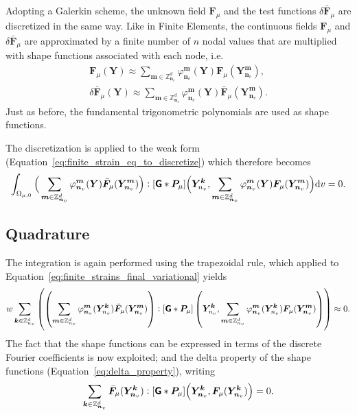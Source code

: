 Adopting a Galerkin scheme, the unknown field \(\bm{F}_\mu\) and the test functions \(\delta \bar{\bm{F}}_\mu\) are discretized in the same way.
Like in Finite Elements, the continuous fields \(\bm{F}_\mu\) and \(\delta \bar{\bm{F}}_\mu\) are approximated by a finite number of \(n\) nodal values that are multiplied with shape functions associated with each node, i.e.
\begin{gather}
\bm{F}_\mu(\bm Y)  \approx \sum_{\bm m\in\mathbb{Z}^d_{\bm n_v} } \varphi_{\bm n_v}^{\bm m}(\bm Y) \bm{F}_\mu (\bm Y^{\bm m}_{\bm n_v}), \\
\delta \bar{\bm{F}}_\mu(\bm Y) \approx \sum_{\bm m\in\mathbb{Z}^d_{\bm n_v} } \varphi_{\bm n_v}^{\bm m}(\bm Y) \bar{\bm{F}}_\mu (\bm Y^{\bm m}_{\bm n_v}).
\end{gather}
Just as before, the fundamental trigonometric polynomials are used as shape functions.

The discretization is applied to the weak form (Equation~\eqref{eq:finite_strain_eq_to_discretize}) which therefore becomes
\begin{equation} \label{eq:finite_strains_final_variational}
\int_{\Omega_{\mu,0}} \Big(\sum_{\bm m\in\mathbb{Z}^d_{\bm n_v} } \varphi_{\bm n_v}^{\bm m}(\bm Y) \bar{\bm{F}}_\mu (\bm Y^{\bm m}_{\bm n_v})\Big):[\boldsymbol{\mathsf{G}} * \bm{P}_\mu]\Big(\bm Y^{\bm k}_{n_v}, \sum_{\bm m\in\mathbb{Z}^d_{\bm n_v} } \varphi_{\bm n_v}^{\bm m}(\bm Y) \bm{F}_\mu (\bm Y^{\bm m}_{\bm n_v})\Big) \mathrm{d} v=0.
\end{equation}

\subsection{Quadrature}

The integration is again performed using the trapezoidal rule, which applied to Equation~\eqref{eq:finite_strains_final_variational} yields
\begin{equation}
w\sum_{\bm k\in\mathbb{Z}^d_{n_v}} \left(\left(\sum_{\bm m\in\mathbb{Z}^d_{n_v} } \varphi_{\bm n_v}^{\bm m}(\bm Y^{\bm k}_{n_v}) \bar{\bm{F}}_\mu (\bm Y^{\bm m}_{\bm n_v})\right):[\boldsymbol{\mathsf{G}} * \bm{P}_\mu]\left(\bm Y^{\bm k}_{n_v},\sum_{\bm m\in\mathbb{Z}^d_{n_v} } \varphi_{\bm n_v}^{\bm m}(\bm Y^{\bm k}_{n_v}) \bm{F}_\mu (\bm Y^{\bm m}_{\bm n_v})\right)\right)\approx 0.
\end{equation}
The fact that the shape functions can be expressed in terms of the discrete Fourier coefficients is now exploited; and the delta property of the shape functions (Equation~\eqref{eq:delta_property}), writing
\begin{equation} \label{eq:final_form_sum_finite_strain}
\sum_{\bm  k \in \mathbb{Z}_{\bm n_v}^{d}} \bar{\bm{F}}_\mu (\bm Y^{\bm k}_{\bm n_v}):[\boldsymbol{\mathsf{G}} * \bm P_\mu]\Big(\bm Y_{\bm n_v}^{\bm k}, \bm{F}_\mu (\bm Y^{\bm k}_{\bm n_v})\Big)=0.
\end{equation}


